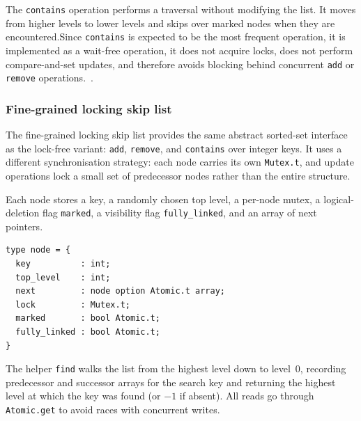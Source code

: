 \documentclass[11pt,a4paper]{article}
\begin{document}
The \texttt{contains} operation performs a traversal without modifying the list. It moves from higher levels to lower levels and skips over marked nodes when they are encountered.Since \texttt{contains} is expected to be the most frequent operation, it is implemented as a wait-free operation,  it does not acquire locks, does not perform compare-and-set updates, and therefore avoids blocking behind concurrent \texttt{add} or \texttt{remove} operations.~\cite{herlihy2021art}.

\subsubsection{Fine-grained locking skip list}
\label{sec:finegrain-impl}

The fine-grained locking skip list provides the same abstract sorted-set
interface as the lock-free variant: \texttt{add}, \texttt{remove}, and
\texttt{contains} over integer keys.  It uses a different synchronisation
strategy: each node carries its own \texttt{Mutex.t}, and update operations
lock a small set of predecessor nodes rather than the entire structure.

Each node stores a key, a randomly chosen top level, a per-node mutex, a
logical-deletion flag \texttt{marked}, a visibility flag
\texttt{fully\_linked}, and an array of next pointers. 

\begin{lstlisting}[language=caml,caption={Node type for fine grained skip list.}]
type node = {
  key          : int;
  top_level    : int;
  next         : node option Atomic.t array;
  lock         : Mutex.t;
  marked       : bool Atomic.t;
  fully_linked : bool Atomic.t;
}
\end{lstlisting}

\vspace{3em}
The helper \texttt{find} walks the list from the highest level down to level~0,
recording predecessor and successor arrays for the search key and returning the
highest level at which the key was found (or $-1$ if absent).  All reads go
through \texttt{Atomic.get} to avoid races with concurrent writes.
\end{document}
